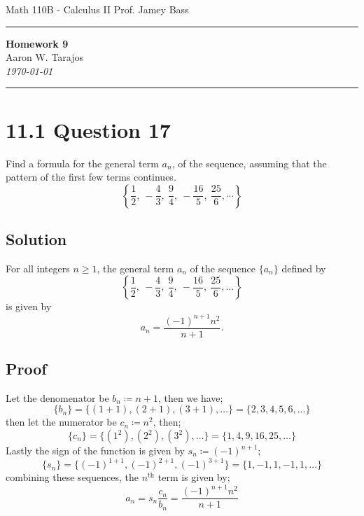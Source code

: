 \documentclass{article}
\begin{document}
\noindent
Math 110B - Calculus II  \hfill Prof. Jamey Bass

\noindent\rule{\textwidth}{0.4pt}

\begin{center}
    \textbf{\LARGE Homework 9} \\
    \vspace{12pt}
    \large Aaron W. Tarajos \\
    \textit{\today}
\end{center}

\noindent\rule{\textwidth}{0.4pt}

\section*{11.1 Question 17}
Find a formula for the general term $a_n$, of the sequence, assuming that the pattern of the first few terms continues.
\[
	\left\{ \frac{1}{2},\ -\frac{4}{3},\ \frac{9}{4},\ -\frac{16}{5},\ \frac{25}{6}, \cdots \right\}
\]

\subsection*{Solution}
For all integers \( n \geq 1 \), the general term \( a_n \) of the sequence \( \{ a_n \} \) defined by
\[
\left\{ \frac{1}{2},\ -\frac{4}{3},\ \frac{9}{4},\ -\frac{16}{5},\ \frac{25}{6}, \ldots \right\}
\]
is given by
\begin{equation}
\label{eq:an_formula}
a_n = \frac{(-1)^{n+1} n^2}{n+1}.
\end{equation}

\subsection*{Proof}
Let the denomenator be $b_n \coloneqq n+1$, then we have;
\[
	\{b_n\} = \{ (1+1),(2+1),(3+1),\dots \} = \{2,3,4,5,6,\dots\}
\]
then let the numerator be $c_n \coloneqq n^2$, then;
\[
	\{ c_n \} = \{ (1^2),(2^2),(3^2),\dots \} = \{ 1,4,9,16,25,\dots\}
\]
Lastly the sign of the function is given by $s_n \coloneqq (-1)^{n+1}$;
\[
	\{ s_n \} = \{ (-1)^{1+1},(-1)^{2+1},(-1)^{3+1} \} = \{ 1,-1,1,-1,1,\dots \}
\]
combining these sequences, the $n^{\text{th}}$ term is given by;
\[
	a_n = s_n \frac{c_n}{b_n} = \frac{(-1)^{n+1} n^2}{n+1}
\]
\end{document}
